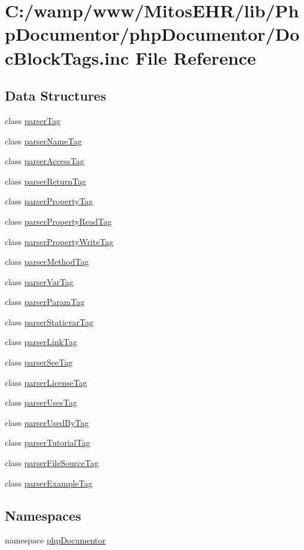 \hypertarget{_doc_block_tags_8inc}{\section{\-C\-:/wamp/www/\-Mitos\-E\-H\-R/lib/\-Php\-Documentor/php\-Documentor/\-Doc\-Block\-Tags.inc \-File \-Reference}
\label{_doc_block_tags_8inc}
}
\subsection*{\-Data \-Structures}
\begin{DoxyCompactItemize}
\item 
class \hyperlink{classparser_tag}{parser\-Tag}
\item 
class \hyperlink{classparser_name_tag}{parser\-Name\-Tag}
\item 
class \hyperlink{classparser_access_tag}{parser\-Access\-Tag}
\item 
class \hyperlink{classparser_return_tag}{parser\-Return\-Tag}
\item 
class \hyperlink{classparser_property_tag}{parser\-Property\-Tag}
\item 
class \hyperlink{classparser_property_read_tag}{parser\-Property\-Read\-Tag}
\item 
class \hyperlink{classparser_property_write_tag}{parser\-Property\-Write\-Tag}
\item 
class \hyperlink{classparser_method_tag}{parser\-Method\-Tag}
\item 
class \hyperlink{classparser_var_tag}{parser\-Var\-Tag}
\item 
class \hyperlink{classparser_param_tag}{parser\-Param\-Tag}
\item 
class \hyperlink{classparser_staticvar_tag}{parser\-Staticvar\-Tag}
\item 
class \hyperlink{classparser_link_tag}{parser\-Link\-Tag}
\item 
class \hyperlink{classparser_see_tag}{parser\-See\-Tag}
\item 
class \hyperlink{classparser_license_tag}{parser\-License\-Tag}
\item 
class \hyperlink{classparser_uses_tag}{parser\-Uses\-Tag}
\item 
class \hyperlink{classparser_used_by_tag}{parser\-Used\-By\-Tag}
\item 
class \hyperlink{classparser_tutorial_tag}{parser\-Tutorial\-Tag}
\item 
class \hyperlink{classparser_file_source_tag}{parser\-File\-Source\-Tag}
\item 
class \hyperlink{classparser_example_tag}{parser\-Example\-Tag}
\end{DoxyCompactItemize}
\subsection*{\-Namespaces}
\begin{DoxyCompactItemize}
\item 
namespace \hyperlink{namespacephp_documentor}{php\-Documentor}
\end{DoxyCompactItemize}
